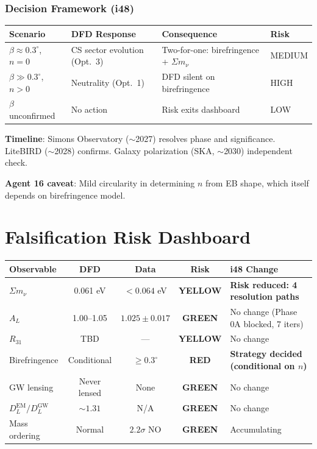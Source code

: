 \documentclass[11pt,a4paper]{article}
\newcommand{\GREEN}{\textcolor{dfdgreen}{\textbf{GREEN}}}
\newcommand{\YELLOW}{\textcolor{dfdyellow}{\textbf{YELLOW}}}
\newcommand{\RED}{\textcolor{dfdred}{\textbf{RED}}}
\begin{document}
\section{Decision Framework (i48)}

\begin{center}
\begin{tabular}{lp{4cm}p{4cm}l}
\toprule
\textbf{Scenario} & \textbf{DFD Response} & \textbf{Consequence} & \textbf{Risk} \\
\midrule
$\beta \approx 0.3^\circ$, $n = 0$ & CS sector evolution (Opt.\ 3) & Two-for-one: birefringence + $\Sigma m_\nu$ & MEDIUM \\
$\beta \gg 0.3^\circ$, $n > 0$ & Neutrality (Opt.\ 1) & DFD silent on birefringence & HIGH \\
$\beta$ unconfirmed & No action & Risk exits dashboard & LOW \\
\bottomrule
\end{tabular}
\end{center}

\textbf{Timeline}: Simons Observatory ($\sim$2027) resolves phase and significance. LiteBIRD ($\sim$2028) confirms. Galaxy polarization (SKA, $\sim$2030) independent check.

\textbf{Agent 16 caveat}: Mild circularity in determining $n$ from EB shape, which itself depends on birefringence model.


\part{Falsification Risk Dashboard}

\begin{center}
\begin{tabular}{lcccl}
\toprule
\textbf{Observable} & \textbf{DFD} & \textbf{Data} & \textbf{Risk} & \textbf{i48 Change} \\
\midrule
$\Sigma m_\nu$ & 0.061 eV & $< 0.064$ eV & \YELLOW & \textbf{Risk reduced: 4 resolution paths} \\
$A_L$ & 1.00--1.05 & $1.025 \pm 0.017$ & \GREEN & No change (Phase 0A blocked, 7 iters) \\
$R_{31}$ & TBD & --- & \YELLOW & No change \\
Birefringence & Conditional & $\geq 0.3^\circ$ & \RED & \textbf{Strategy decided (conditional on $n$)} \\
GW lensing & Never lensed & None & \GREEN & No change \\
$D_L^{\text{EM}}/D_L^{\text{GW}}$ & $\sim 1.31$ & N/A & \GREEN & No change \\
Mass ordering & Normal & $2.2\sigma$ NO & \GREEN & Accumulating \\
\bottomrule
\end{tabular}
\end{center}
\end{document}
